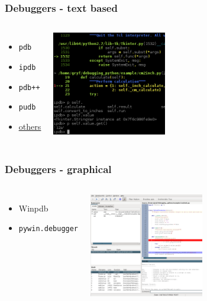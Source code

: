 \documentclass[14pt,notes,svgnames,aspectratio=169]{beamer}
\begin{document}
\begin{frame}
    \frametitle{Debuggers - text based}
    \begin{columns}
        \begin{itemize}
            \item \lstinline{pdb}
            \item \lstinline{ipdb}
            \item \lstinline{pdb++}
            \item \lstinline{pudb}
            \item \color{blue}\href{https://wiki.python.org/moin/PythonDebuggingTools}{\uline{others}}
        \end{itemize}

        \vspace*{0cm}
        \hspace*{0cm}\includegraphics[width=5cm]{"images/ipdb.png"}

    \end{columns}
\end{frame}

\begin{frame}
    \frametitle{Debuggers - graphical}
    \begin{columns}
        \begin{itemize}
            \item Winpdb
            \item \lstinline{pywin.debugger}
        \end{itemize}

        \vspace*{0cm}
        \hspace*{0cm}\includegraphics[width=5cm]{"images/winpdb.png"}

    \end{columns}
\end{frame}
\end{document}
